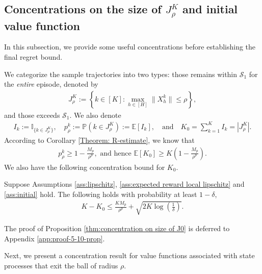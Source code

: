 \documentclass[final,supplement]{siamart251216}
\begin{document}
 

\subsection{Concentrations on the size of $J_{\rho}^{K}$ and initial value function }

In this subsection, we provide some useful concentrations before establishing the final regret bound.

We categorize the sample trajectories into two types: those %
remains within $\mathcal{S}_1$ %
for the {\it entire} episode, denoted by 
 \begin{eqnarray}\label{eq:J0}
J_{\rho}^{K}:=\left\{k \in [K]: \max_{h\in[H]}\|X_{h}^{k}\|\leq \rho \right\},
 \end{eqnarray}
and those 
exceeds $\mathcal{S}_1$.  
We also denote  
\begin{eqnarray*}
I_k:=\mathbb{I}_{\{k\in J^K_\rho\}}, \quad p_{\rho}^{k}:=\mathbb{P}\left(k\in J^K_\rho\right):=\mathbb{E} [I_k], 
\quad \mbox{and}\quad K_{0}=\sum_{k=1}^{K}I_{k} = |J_{\rho}^{K}|.
\end{eqnarray*} 
According to Corollary \ref{Theorem: R-estimate}, we know that 
\begin{eqnarray}\label{ineq:alpha_p}
    p_{\rho}^{k} \geq 1-\frac{M_{p}}{\rho^{p}}, \mbox{ and hence } \mathbb{E}[K_{0}]\geq K\left(1-\frac{M_{p}}{\rho^{p}}\right).
\end{eqnarray}
We also have the following concentration bound for $K_0$.
\begin{proposition}\label{thm:concentration on size of J0}
Suppose Assumptions \ref{ass:lipschitz}, \ref{ass:expected reward local lipschitz} and \ref{ass:initial} hold. The following holds with probability at least $1-\delta$, 
\begin{eqnarray*}
     K-K_{0} \leq \frac{KM_{p}}{\rho^{p}}+\sqrt{2K\log\left(\frac{1}{\delta}\right)}.
\end{eqnarray*}
\end{proposition}
The proof of Proposition \ref{thm:concentration on size of J0} is deferred to Appendix \ref{app:proof-5-10-prop}. 




Next, we present a concentration result for value functions associated with state processes that exit the ball of radius $\rho$.

\end{document}
